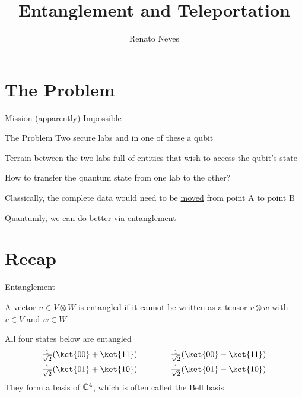 \documentclass{beamer}
\author[Renato Neves]{Renato Neves}
\date{}
\begin{document}
\title{Entanglement and Teleportation}

\frame[plain]{\titlepage}

\section{The Problem}

\begin{frame}{Mission (apparently) Impossible}

        \begin{block}{The Problem}
                Two secure labs and in one of these a qubit 

                Terrain between the two labs full of entities
                that wish to access the qubit's state

                How to transfer the quantum state from one lab to the other?
        \end{block}

        \pause
        Classically, the complete data would need to be \alert{\underline{moved}}
        from point A to point B

        \pause
        Quantumly, we can do better via entanglement
\end{frame}

\section{Recap}

\begin{frame}{Entanglement}

        \begin{definition}
                A vector $u \in V \otimes W$ is \alert{entangled} if it cannot
                be written as a tensor $v \otimes w$ with $v \in V$ and $w \in
                W$
        \end{definition}

        \pause
        \begin{example}
                All four states below are entangled
                \begin{align*}
                        \textstyle{\frac{1}{\sqrt{2}}}(\ket{00} + \ket{11})
                        \qquad \qquad &
                        \textstyle{\frac{1}{\sqrt{2}}}(\ket{00} - \ket{11})
                        \\
                        \textstyle{\frac{1}{\sqrt{2}}}(\ket{01} + \ket{10})
                        \qquad \qquad &
                        \textstyle{\frac{1}{\sqrt{2}}}(\ket{01} - \ket{10})
                \end{align*}
                They form a basis of $\mathbb{C}^4$,
                which is often called the \alert{Bell basis}
        \end{example}
\end{frame}
\end{document}
